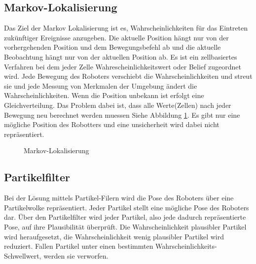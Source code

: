 \documentclass{article}
\begin{document}
\subsection{Markov-Lokalisierung}
Das Ziel der Markov Lokalisierung ist es, Wahrscheinlichkeiten f\"ur das Eintreten zuk\"unftiger Ereignisse anzugeben.
Die aktuelle Position h\"angt nur von der vorhergehenden Position und dem
Bewegungsbefehl ab und die aktuelle Beobachtung h\"angt nur von der aktuellen Position ab.
Es ist ein zellbasiertes Verfahren bei dem jeder Zelle Wahrescheinlichkeitswert oder Belief
zugeordnet wird. \cite{ZweigleStuttgart}
Jede Bewegung des Roboters verschiebt die Wahrscheinlichkeiten und streut sie und jede Messung von Merkmalen der Umgebung \"andert die Wahrscheinlichkeiten.
Wenn die Position unbekann ist erfolgt eine Gleichverteilung.
Das Problem dabei ist, dass alle Werte(Zellen) nach jeder Bewegung neu berechnet werden muessen Siehe Abbildung \ref{MarkovLokalisierung}. Es gibt nur eine m\"ogliche Position des Robotters und eine unsicherheit wird dabei nicht repr\"asentiert.


\begin{figure}
  \centering
  \caption{Markov-Lokalisierung \cite{ZweigleStuttgart}}
  \label{MarkovLokalisierung}
\end{figure}







\subsection{Partikelfilter}
Bei der L\"osung mittels Partikel-Filern wird die Pose des Roboters \"uber eine Partikelwolke repr\"asentiert.\cite{WIKIpartikelfilter} Jeder Partikel stellt eine m\"ogliche Pose des Roboters dar. Über den Partikelfilter wird jeder Partikel, also jede dadurch repr\"asentierte Pose, auf ihre Plausibilit\"at \"uberpr\"uft. Die Wahrscheinlichkeit plausibler Partikel wird heraufgesetzt, die Wahrscheinlichkeit wenig plausibler Partikel wird reduziert. Fallen Partikel unter einen bestimmten Wahrscheinlichkeits-Schwellwert, werden sie verworfen.
\end{document}
